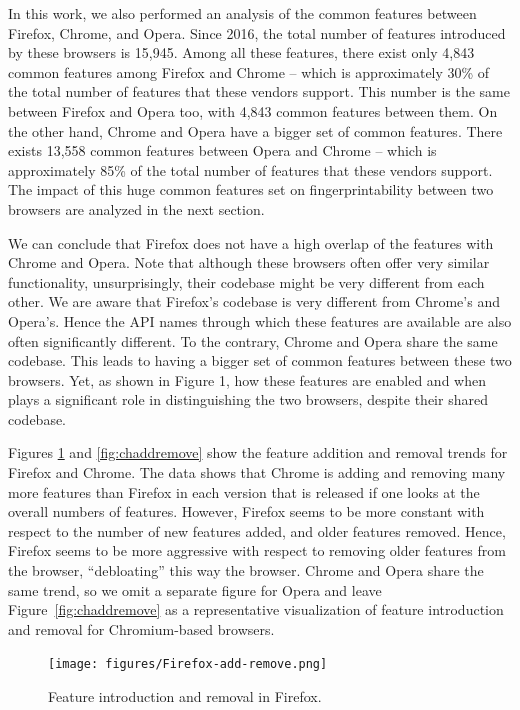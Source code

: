   In this work, we also performed an analysis of the common features
  between Firefox, Chrome, and Opera. Since 2016, the total number of features
  introduced by these browsers is 15,945. Among all these features,
  there exist only 4,843 common features among Firefox and Chrome -- which is
  approximately 30\% of the total number of features that these
  vendors support. This number is the same between Firefox and Opera too, with
  4,843 common features between them. On the other hand, Chrome and Opera
  have a bigger set of common features. There exists 13,558 
  common features between Opera and Chrome -- which is approximately 85\% of the total
  number of features that these vendors support. The impact of this huge common features set
  on fingerprintability between two browsers are analyzed in the next section.

  We can conclude that Firefox does not have a high overlap of the features with Chrome and Opera.
  Note that although these browsers often offer very similar functionality,
  unsurprisingly, their codebase might be very different from each other.
  We are aware that Firefox's codebase is very different from Chrome's and Opera's.
  Hence the API names through which these features are available are also often
  significantly different. 
  To the contrary, Chrome and Opera share the same codebase.
  This leads to having a bigger set of common features between these two browsers. Yet, as shown in Figure 1, how these features are enabled and when plays a significant role in distinguishing the two browsers, despite their shared codebase.

  Figures \ref{fig:ffaddremove} and \ref{fig:chaddremove} show the
  feature addition and removal trends for Firefox and Chrome. The data
  shows that Chrome is adding and removing many more features than
  Firefox in each version that is released if one looks at the overall
  numbers of features. However, Firefox seems to be more constant with
  respect to the number of new features added, and older features
  removed. Hence, Firefox seems to be more aggressive with respect to
  removing older features from the browser, ``debloating'' this way 
  the browser. Chrome and Opera share the same trend, so we omit a separate figure for Opera and leave Figure~\ref{fig:chaddremove} as a representative visualization of feature introduction and removal for Chromium-based browsers.

\begin{figure}[ht]
    \centering
    \texttt{[image: figures/Firefox-add-remove.png]}
    \caption{Feature introduction and removal in Firefox.}
    \label{fig:ffaddremove}
\end{figure}


